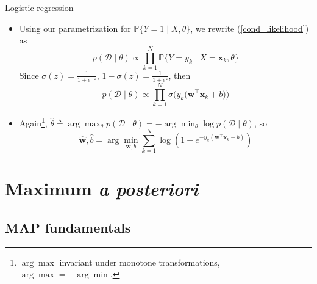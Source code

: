 \documentclass{beamer}
\numberwithin{equation}{section}
\newcommand{\aref}[1]{\alert{\ref{#1}}}
\begin{document}
\begin{frame}{Logistic regression}
    \begin{itemize}
        \item
        Using our parametrization for $ \mathbb{P}\{Y = 1 \mid X, \theta\} $,
        we rewrite (\aref{cond_likelihood}) as
        \begin{equation*}
            p(\mathcal{D} \mid \theta) \propto
            \prod_{k = 1}^N\mathbb{P}\{Y = y_k \mid X = \mathbf{x}_k, \theta\}
        \end{equation*}
        Since $ \sigma(z) = \frac{1}{1 + e^{-z}} $, 
        $ 1 - \sigma(z) = \frac{1}{1 + e^z} $, then
        \begin{equation*}
            p(\mathcal{D} \mid \theta) \propto \prod_{k = 1}^N
            \sigma\big(y_k\big(\mathbf{w}^\top\mathbf{x}_k + b\big)\big)
        \end{equation*}

        \item
        Again\footnote{
            $ \arg\max $ invariant under monotone transformations,
            $ \arg\max = -\arg\min $.
        }, $ \hat{\theta} \triangleq \arg\max_\theta
        p(\mathcal{D} \mid \theta) = -\arg\min_\theta
        \log p(\mathcal{D} \mid \theta) $, so
        \begin{equation} \label{logreg_like2cost}
            \hat{\mathbf{w}}, \hat{b} = \arg\min_{\mathbf{w}, b}\sum_{k = 1}^N
            \log\left(1 + e^{-y_k(\mathbf{w}^\top\mathbf{x}_k + b)}\right)
        \end{equation}
    \end{itemize}

    \medskip
\end{frame}

\section{Maximum \textit{a posteriori}}

\subsection{MAP fundamentals}
\end{document}
